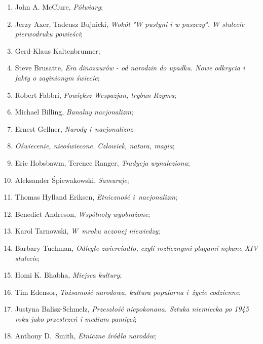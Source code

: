 \documentclass[a4paper,11pt]{article}
\begin{document}
\begin{enumerate}
\item John A. McClure, \emph{Półwiary};

\item Jerzy Axer, Tadeusz Bujnicki, \emph{Wokół "W pustyni i
    w puszczy". W stulecie pierwodruku powieści};

\item Gerd-Klaus Kaltenbrunner;

\item Steve Brusatte, \emph{Era dinozaurów - od narodzin do upadku.
    Nowe odkrycia i fakty o zaginionym świecie};

\item Robert Fabbri, \emph{Powiększ Wespazjan, trybun Rzymu};

\item Michael Billing, \emph{Banalny nacjonalizm};

\item Ernest Gellner, \emph{Narody i~nacjonalizm};

\item \emph{Oświecenie, nieoświecone. Człowiek, natura, magia};

\item Eric Hobsbawm, Terence Ranger, \emph{Tradycja wynaleziona};

\item Aleksander Śpiewakowski, \emph{Samuraje};

\item Thomas Hylland Eriksen, \emph{Etniczność i~nacjonalizm};

\item Benedict Andreson, \emph{Wspólnoty wyobrażone};

\item Karol Tarnowski, \emph{W~mroku uczonej niewiedzy};

\item Barbary Tuchman, \emph{Odległe zwierciadło, czyli rozlicznymi
    plagami nękane XIV stulecie};

\item Homi K. Bhabha, \emph{Miejsca kultury};

\item Tim Edensor, \emph{Tożsamość narodowa, kultura popularna i~życie
    codzienne};

\item Justyna Balisz-Schmelz, \emph{Przeszłość niepokonana. Sztuka
    niemiecka po 1945 roku jako przestrzeń i medium pamięci};

\item Anthony D.~Smith, \emph{Etniczne źródła narodów};


\end{enumerate}
\end{document}
